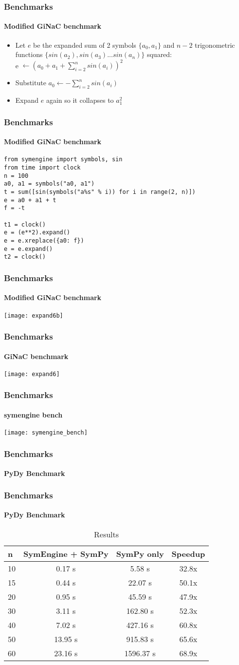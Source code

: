 \documentclass{beamer}
\begin{document}
\begin{frame}
\frametitle{Benchmarks}
\framesubtitle{Modified GiNaC benchmark}
\begin{itemize}  
\item Let $e$ be the expanded sum of 2 symbols $\{a_0, a_1\}$ and $n-2$ trigonometric functions $\{sin(a_2), sin(a_3)...sin(a_n)\}$ squared:\\
e $\leftarrow (a_0+a_1+\sum_{i=2}^{n} sin(a_i))^2$    
\item Substitute $a_0 \leftarrow -\sum_{i=2}^{n} sin(a_i)$ 
\item Expand $e$ again so it collapses to $a_1^2$
\end{itemize}
\end{frame}


\begin{frame}[fragile]
\frametitle{Benchmarks}
\framesubtitle{Modified GiNaC benchmark}
\begin{verbatim}
from symengine import symbols, sin
from time import clock
n = 100
a0, a1 = symbols("a0, a1")
t = sum([sin(symbols("a%s" % i)) for i in range(2, n)])
e = a0 + a1 + t
f = -t

t1 = clock()
e = (e**2).expand()
e = e.xreplace({a0: f})
e = e.expand()
t2 = clock()
\end{verbatim}
\end{frame}

\begin{frame}
\frametitle{Benchmarks}
\framesubtitle{Modified GiNaC benchmark}
\texttt{[image: expand6b]}
\end{frame}

\begin{frame}
\frametitle{Benchmarks}
\framesubtitle{GiNaC benchmark}
\texttt{[image: expand6]}
\end{frame}

\begin{frame}
\frametitle{Benchmarks}
\framesubtitle{symengine bench}
\texttt{[image: symengine\_bench]}
\end{frame}


\begin{frame}
\frametitle{Benchmarks}
\framesubtitle{PyDy Benchmark}
\end{frame}


\begin{frame}
\frametitle{Benchmarks}
\framesubtitle{PyDy Benchmark}
\begin{table}
\begin{tabular}{l | c | c | c  }
n & SymEngine + SymPy & SymPy only & Speedup\\
\hline \hline
10 & 0.17 s & 5.58 s & 32.8x \\
15 & 0.44 s & 22.07 s & 50.1x \\
20 & 0.95 s & 45.59 s & 47.9x \\
30 & 3.11 s & 162.80 s & 52.3x \\
40 & 7.02 s & 427.16 s & 60.8x \\
50 & 13.95 s & 915.83 s & 65.6x \\
60 & 23.16 s & 1596.37 s & 68.9x
\end{tabular}
\caption{Results}
\end{table}
\end{frame}
\end{document}
